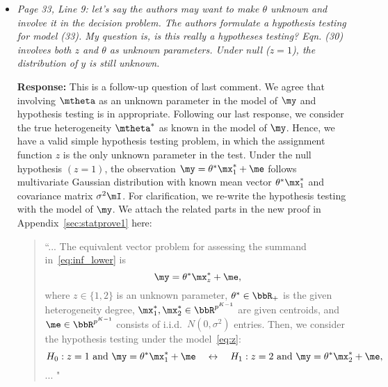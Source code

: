 \documentclass[11pt]{article}
\theoremstyle{definition}
\theoremstyle{definition}
\begin{document}
\begin{enumerate}
\begin{enumerate}[wide]
\begin{itemize}
        
        \item \textit{Page 33, Line 9: let’s say the authors may want to make $\theta$ unknown and involve it in the decision problem. The authors formulate a hypothesis testing for model (33). My question is, is this really a hypotheses testing? Eqn. (30) involves both $z$ and $\theta$ as unknown parameters. Under null ($z = 1$), the distribution of $y$ is still unknown.}
        
        \textbf{Response:} This is a follow-up question of last comment. We agree that involving $\mtheta$ as an unknown parameter in the model of $\my$ and hypothesis testing is in appropriate. Following our last response, we consider the true heterogeneity $\mtheta^*$ as known in the model of $\my$. Hence, we have a valid simple hypothesis testing problem, in which the assignment function $z$ is the only unknown parameter in the test. Under the null hypothesis $(z = 1)$, the observation $\my = \theta^* \mx_1^* + \me$ follows multivariate Gaussian distribution with known mean vector $\theta^* \mx_1^*$ and covariance matrix $\sigma^2 \mI$. For clarification, we re-write the hypothesis testing with the model of $\my$. We attach the related parts in the new proof in Appendix~\ref{sec:statprove1} here:
        
        \begin{quote}
            ``...
            The equivalent vector problem for assessing the summand in~\eqref{eq:inf_lower} is
\begin{equation}
\my=\theta^* \mx_{z}^*+\me,
\end{equation}
where $z\in \{1,2\}$ is an unknown parameter, $\theta^* \in \bbR_+$ is the given heterogeneity degree, $\mx_1^*,\mx_2^*\in\bbR^{p^{K-1}}$ are given centroids, and $\me\in\bbR^{p^{K-1}}$ consists of i.i.d.\ $N(0,\sigma^2)$ entries.  Then, we consider the hypothesis testing under the model~\eqref{eq:z}:
\begin{equation}
 H_0: z = 1 \text{ and } \my = \theta^* \mx_1^* + \me \quad \leftrightarrow \quad H_1: z = 2 \text{ and } \my = \theta^* \mx_2^* + \me,
\end{equation}
...
            "
        \end{quote}
        
        

\end{itemize}
\end{enumerate}
\end{enumerate}
\end{document}
